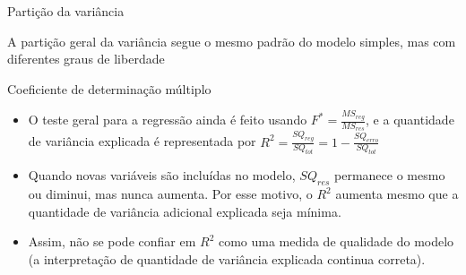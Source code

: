\documentclass{beamer}\usepackage[]{graphicx}\usepackage[]{color}
\begin{document}
\begin{frame}{Partição da variância}

A partição geral da variância segue o mesmo padrão do modelo simples, mas com diferentes graus de liberdade
\vfill
{}

\end{frame}


\begin{frame}{Coeficiente de determinação múltiplo}

\begin{itemize}

\item O teste geral para a regressão ainda é feito usando $F^* = \frac{MS_{reg}}{MS_{res}}$, e a quantidade de variância explicada é representada por $R^2 = \frac{SQ_{reg}}{SQ_{tot}} = 1 - \frac{SQ_{erro}}{SQ_{tot}}$ \pause

\vfill

\item Quando novas variáveis são incluídas no modelo, $SQ_{res}$ permanece o mesmo ou diminui, mas nunca aumenta. \pause
\vfill
Por esse motivo, o $R^2$ aumenta mesmo que a quantidade de variância adicional explicada seja mínima. \pause
\vfill
\item Assim, não se pode confiar em $R^2$ como uma medida de qualidade do modelo (a interpretação de quantidade de variância explicada continua correta).


\end{itemize}

\end{frame}
\end{document}
